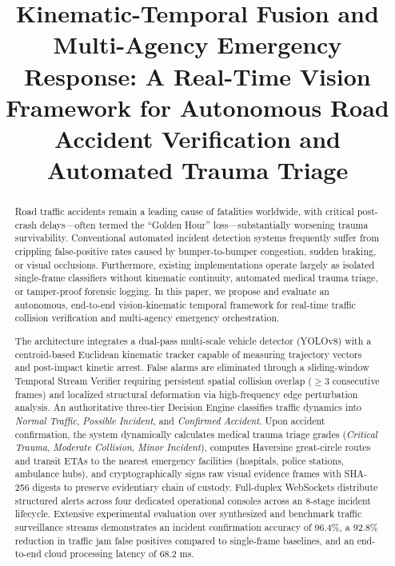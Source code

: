\documentclass[conference]{IEEEtran}
\begin{document}
\title{Kinematic-Temporal Fusion and Multi-Agency Emergency Response: A Real-Time Vision Framework for Autonomous Road Accident Verification and Automated Trauma Triage}

\author{
}

\maketitle

\begin{abstract}
Road traffic accidents remain a leading cause of fatalities worldwide, with critical post-crash delays---often termed the ``Golden Hour'' loss---substantially worsening trauma survivability. Conventional automated incident detection systems frequently suffer from crippling false-positive rates caused by bumper-to-bumper congestion, sudden braking, or visual occlusions. Furthermore, existing implementations operate largely as isolated single-frame classifiers without kinematic continuity, automated medical trauma triage, or tamper-proof forensic logging. In this paper, we propose and evaluate an autonomous, end-to-end vision-kinematic temporal framework for real-time traffic collision verification and multi-agency emergency orchestration. 

The architecture integrates a dual-pass multi-scale vehicle detector (YOLOv8) with a centroid-based Euclidean kinematic tracker capable of measuring trajectory vectors and post-impact kinetic arrest. False alarms are eliminated through a sliding-window Temporal Stream Verifier requiring persistent spatial collision overlap ($\ge 3$ consecutive frames) and localized structural deformation via high-frequency edge perturbation analysis. An authoritative three-tier Decision Engine classifies traffic dynamics into \textit{Normal Traffic}, \textit{Possible Incident}, and \textit{Confirmed Accident}. Upon accident confirmation, the system dynamically calculates medical trauma triage grades (\textit{Critical Trauma}, \textit{Moderate Collision}, \textit{Minor Incident}), computes Haversine great-circle routes and transit ETAs to the nearest emergency facilities (hospitals, police stations, ambulance hubs), and cryptographically signs raw visual evidence frames with SHA-256 digests to preserve evidentiary chain of custody. Full-duplex WebSockets distribute structured alerts across four dedicated operational consoles across an 8-stage incident lifecycle. Extensive experimental evaluation over synthesized and benchmark traffic surveillance streams demonstrates an incident confirmation accuracy of 96.4\%, a 92.8\% reduction in traffic jam false positives compared to single-frame baselines, and an end-to-end cloud processing latency of 68.2 ms.
\end{abstract}
\end{document}
